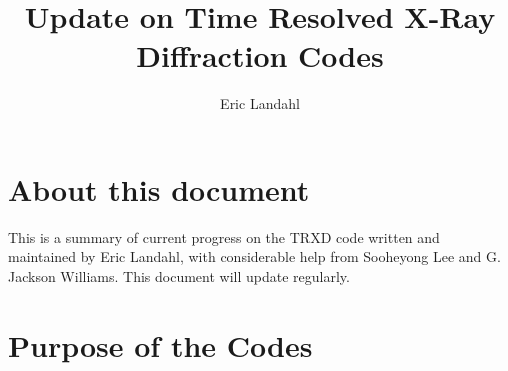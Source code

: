 \documentclass[letterpaper,11pt]{article}
\begin{document}
\title{Update on Time Resolved X-Ray Diffraction Codes}
\author{Eric Landahl}

\maketitle

\section{About this document}
This is a summary of current progress on the TRXD code written and maintained by Eric Landahl, with considerable help from Sooheyong Lee and G. Jackson Williams.  This document will update regularly.

\section{Purpose of the Codes}
\end{document}
